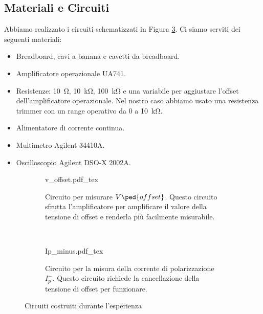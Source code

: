 \subsection{Materiali e Circuiti}

Abbiamo realizzato i circuiti schematizzati in Figura \ref{fig:circuits}.
Ci siamo serviti dei seguenti materiali:

\begin{itemize}
    \item{Breadboard, cavi a banana e cavetti da breadboard.}
    \item{Amplificatore operazionale UA741.}
    \item{Resistenze: \SI{10}{\ohm}, \SI{10}{\kilo\ohm}, \SI{100}{\kilo\ohm}
        e una variabile per aggiustare l'offset dell'amplificatore operazionale.
        Nel nostro caso abbiamo usato una resistenza trimmer con un range operativo da 0
        a \SI{10}{\kilo\ohm}.}
    \item{Alimentatore di corrente continua.}
    \item{Multimetro Agilent 34410A.}
    \item{Oscilloscopio Agilent DSO-X 2002A.}
\end{itemize}

\begin{figure}[b]
        \onecolumn
        \centering
        \begin{subfigure}[b]{0.48\textwidth}
            \def\svgwidth{\columnwidth}
            {v_offset.pdf_tex}
            \caption{Circuito per misurare $V\ped{offset}$. Questo circuito sfrutta l'amplificatore
                per amplificare il valore della tensione di offset e renderla più facilmente misurabile.}
            \label{fig:v_off_circ}
        \end{subfigure}
        ~
        \begin{subfigure}[b]{0.48\textwidth}
            \def\svgwidth{\columnwidth}
            {Ip_minus.pdf_tex}
            \caption{Circuito per la misura della corrente di polarizzazione $I_p^-$. Questo circuito
                richiede la cancellazione della tensione di offset per funzionare.}
            \label{fig:ip_minus_circ}
        \end{subfigure}
        \caption{Circuiti costruiti durante l'esperienza}
        \label{fig:circuits}
\end{figure}
